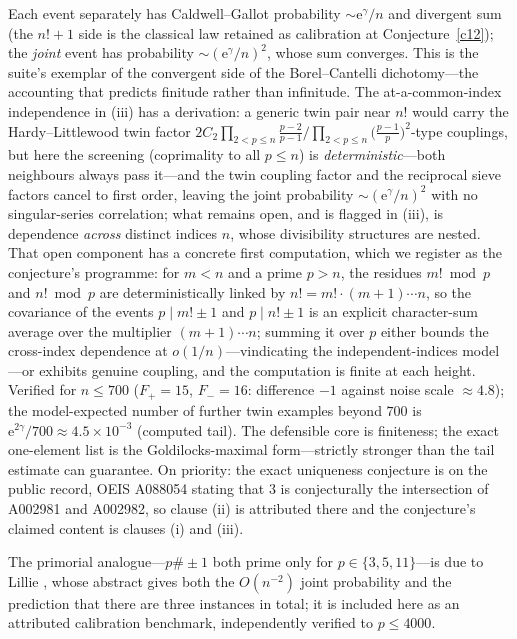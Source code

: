 \documentclass[11pt]{article}
\theoremstyle{definition}
\newcommand{\e}{\mathrm{e}}
\begin{document}
Each event separately has Caldwell--Gallot probability
$\sim\e^{\gamma}/n$ \cite{CaldwellGallot} and divergent sum (the
$n!+1$ side is the classical law retained as calibration at
Conjecture~\ref{c12}); the \emph{joint} event
has probability $\sim(\e^{\gamma}/n)^2$, whose sum converges.  This is
the suite's exemplar of the convergent side of the Borel--Cantelli
dichotomy---the accounting that predicts finitude rather than
infinitude.  The at-a-common-index independence in (iii) has a derivation: a
generic twin pair near $n!$ would carry
the Hardy--Littlewood twin
factor $2C_2\prod_{2<p\le n}\frac{p-2}{p-1}\big/
\prod_{2<p\le n}\bigl(\tfrac{p-1}p\bigr)^{\!2}$-type couplings, but
here the screening (coprimality to all $p\le n$) is
\emph{deterministic}---both neighbours always pass it---and the twin
coupling factor and the reciprocal sieve factors cancel to first
order, leaving the joint probability $\sim(\e^{\gamma}/n)^2$ with no
singular-series correlation; what remains open, and is flagged in
(iii), is dependence \emph{across} distinct indices $n$, whose
divisibility structures are nested.  That open component has a
concrete first computation, which we register as the conjecture's
programme: for $m<n$ and a prime $p>n$, the residues $m!\bmod p$ and
$n!\bmod p$ are deterministically linked by
$n!=m!\cdot(m{+}1)\cdots n$, so the covariance of the events
$p\mid m!\pm1$ and $p\mid n!\pm1$ is an explicit character-sum
average over the multiplier $(m{+}1)\cdots n$; summing it over $p$
either bounds the cross-index dependence at $o(1/n)$---vindicating
the independent-indices model---or exhibits genuine coupling, and
the computation is finite at each height.
Verified for $n\le700$ ($F_+=15$, $F_-=16$: difference $-1$ against
noise scale $\approx4.8$); the model-expected number of further twin
examples beyond $700$ is $\e^{2\gamma}/700\approx4.5\times10^{-3}$
(computed tail).  The defensible core is finiteness; the exact
one-element list is the Goldilocks-maximal form---strictly stronger
than the tail estimate can guarantee.  On priority: the exact
uniqueness conjecture is on the public record, OEIS A088054 stating
that $3$ is conjecturally the intersection of A002981 and A002982, so
clause (ii) is attributed there and the conjecture's claimed content is clauses
(i) and (iii).

The primorial analogue---$p\#\pm1$ both prime only for
$p\in\{3,5,11\}$---is due to Lillie \cite{Lillie}, whose abstract
gives both the $O(n^{-2})$ joint probability and the prediction that
there are three instances in total; it is included here as an
attributed calibration benchmark, independently verified to
$p\le4000$.
\end{document}
